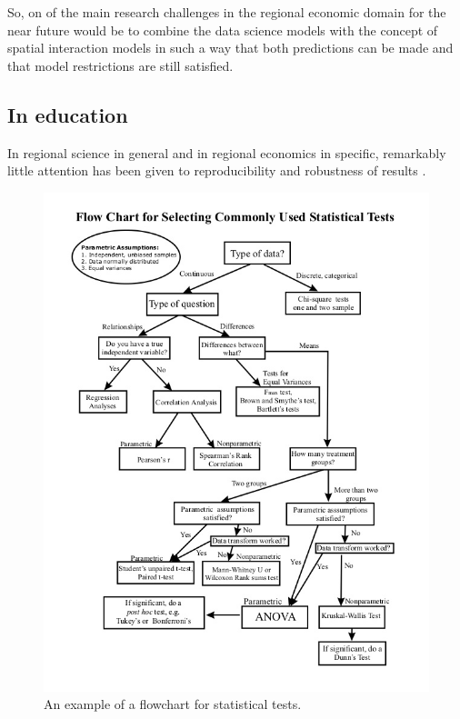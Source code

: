 \documentclass[fleqn,10pt]{SelfArx} %
\begin{document}
So, on of the main research challenges in the regional economic domain for the near future would be to combine
the data science models with the concept of spatial interaction models in such a
way that both predictions can be made and that model restrictions are still
satisfied. 

\subsection{In education}

In regional science in general and in regional economics in specific, remarkably little attention has been given to reproducibility and robustness of results \citep[with some exceptions as, amongst some others, by][]{Rey:2014cl,arribas2015woow, Arribas2016}.

\begin{figure}[t!]\centering 
  \includegraphics[width=\columnwidth]{./figures/flowchart.jpg}
  \caption{An example of a flowchart for statistical tests.}
	\label{fig:flowchart}
\end{figure}
\end{document}
